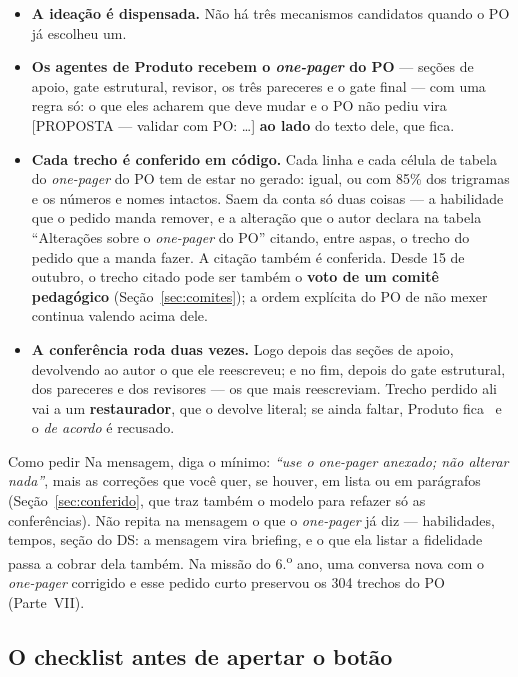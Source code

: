 \documentclass[11pt,a4paper]{article}
\newcommand{\cod}[1]{{\ttfamily\small #1}}
\newcommand{\bolinha}[1]{\tikz[baseline=-0.5ex]{\fill[#1] (0,0) circle (0.33em);}}
\newcommand{\statusVermelho}{\bolinha{sinalVermelho}}
\begin{document}
\begin{itemize}
  \item \textbf{A ideação é dispensada.} Não há três mecanismos candidatos quando o PO já escolheu um.
  \item \textbf{Os agentes de Produto recebem o \emph{one-pager} do PO} --- seções de apoio, gate estrutural, revisor, os três pareceres e o gate final --- com uma regra só: o que eles acharem que deve mudar e o PO não pediu vira \cod{[PROPOSTA — validar com PO: \ldots]} \textbf{ao lado} do texto dele, que fica.
  \item \textbf{Cada trecho é conferido em código.} Cada linha e cada célula de tabela do \emph{one-pager} do PO tem de estar no gerado: igual, ou com 85\% dos trigramas e os números e nomes intactos. Saem da conta só duas coisas --- a habilidade que o pedido manda remover, e a alteração que o autor declara na tabela ``Alterações sobre o \emph{one-pager} do PO'' citando, entre aspas, o trecho do pedido que a manda fazer. A citação também é conferida. Desde 15 de outubro, o trecho citado pode ser também o \textbf{voto de um comitê pedagógico} (Seção~\ref{sec:comites}); a ordem explícita do PO de não mexer continua valendo acima dele.
  \item \textbf{A conferência roda duas vezes.} Logo depois das seções de apoio, devolvendo ao autor o que ele reescreveu; e no fim, depois do gate estrutural, dos pareceres e dos revisores --- os que mais reescreviam. Trecho perdido ali vai a um \textbf{restaurador}, que o devolve literal; se ainda faltar, Produto fica \statusVermelho\ e o \emph{de acordo} é recusado.
\end{itemize}

\begin{caixaPratica}{Como pedir}
Na mensagem, diga o mínimo: \emph{``use o one-pager anexado; não alterar nada''}, mais as correções que você quer, se houver, em lista ou em parágrafos (Seção~\ref{sec:conferido}, que traz também o modelo para refazer só as conferências). Não repita na mensagem o que o \emph{one-pager} já diz --- habilidades, tempos, seção do DS: a mensagem vira briefing, e o que ela listar a fidelidade passa a cobrar dela também. Na missão do 6.\textsuperscript{o} ano, uma conversa nova com o \emph{one-pager} corrigido e esse pedido curto preservou os 304 trechos do PO (Parte~VII).
\end{caixaPratica}

\subsection{O checklist antes de apertar o botão}
\end{document}
